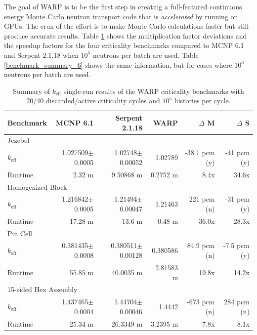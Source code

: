 The goal of WARP is to be the first step in creating a full-featured continuous energy Monte Carlo neutron transport code that is \emph{accelerated} by running on GPUs.  The crux of the effort is to make Monte Carlo calculations faster but still produce accurate results.  Table \ref{benchmark_summary_5} shows the multiplication factor deviations and the speedup factors for the four criticality benchmarks compared to MCNP 6.1 and Serpent 2.1.18 when $10^5$ neutrons per batch are used.  Table  \ref{benchmark_summary_6} shows the same information, but for cases where $10^6$ neutrons per batch are used.

\begin{table}[h]
\centering
\caption{Summary of $k_\mathrm{eff}$ single-run results of the WARP criticality benchmarks with 20/40 discarded/active criticality cycles and $10^5$ histories per cycle.}
\label{benchmark_summary_5}
\begin{tabular}{| l | r | r | r | r | r |}
 \hline
 Benchmark & MCNP 6.1 & Serpent 2.1.18 & WARP & $\Delta$ M & $\Delta$ S  \\
\hline
\hline
\multicolumn{6}{|l|}{Jezebel}  \\
\hline
 $k_\mathrm{eff}$ & 1.027509$\pm$0.0005 & 1.02748$\pm$0.00052 & 1.02789 & -38.1 pcm (y) & -41 pcm (y) \\
 \hline
 Runtime               & 2.32 m & 9.50868 m & 0.2752 m & 8.4x  & 34.6x  \\
 \hline
 \hline
\multicolumn{6}{|l|}{Homogenized Block }\\
\hline
 $k_\mathrm{eff}$ & 1.216842$\pm$0.0005 & 1.21494$\pm$0.00047 & 1.21463 & 221 pcm (n)  & -31 pcm  (y) \\
 \hline
 Runtime               &  17.28 m & 13.6 m & 0.48 m & 36.0x  & 28.3x  \\
 \hline
  \hline
\multicolumn{6}{|l|}{Pin Cell}\\
\hline
 $k_\mathrm{eff}$ & 0.381435$\pm$0.0008 &  0.380511$\pm$0.00128 & 0.380586 & 84.9 pcm (n)&  -7.5 pcm (y)    \\
 \hline
 Runtime               & 55.85 m & 40.0035 m &  2.81583 m &  19.8x & 14.2x  \\
 \hline
  \hline
\multicolumn{6}{|l|}{15-sided Hex Assembly}\\
\hline
 $k_\mathrm{eff}$ & 1.437465$\pm$0.0004 & 1.44704$\pm$0.00046 & 1.4442 & -673 pcm (n) & 284 pcm (n) \\
 \hline
 Runtime               & 25.34 m &  26.3349 m &  3.2395 m  & 7.8x & 8.1x  \\
 \hline
\end{tabular}
\end{table}


